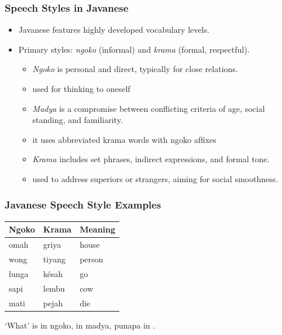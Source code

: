 \documentclass[xetex]{beamer}
\newcommand{\msa}{\mtciteform}
\begin{document}
\begin{frame}
\frametitle{Speech Styles in Javanese}
\begin{itemize}
    \item Javanese features highly developed vocabulary levels.
    \item Primary styles: \textit{ngoko} (informal) and \textit{krama} (formal, respectful).
      \begin{itemize}
      \item  \textit{Ngoko} is personal and direct, typically for close relations.
      \item[] used for thinking to oneself
         \item  \textit{Madya} is a compromise between conﬂicting criteria of
           age, social standing, and familiarity.
           \item[] it uses abbreviated krama words with ngoko afﬁxes
    \item \textit{Krama} includes set phrases, indirect expressions, and formal tone.
    \item[] used to address superiors or strangers, aiming for social smoothness.

      
      \end{itemize}
\end{itemize}
\end{frame}

\begin{frame}
\frametitle{Javanese Speech Style Examples}
\begin{table}[]
\centering
\begin{tabular}{lll}

\textbf{Ngoko} & \textbf{Krama} & \textbf{Meaning} \\
\hline
omah & griya & house \\
wong & tiyang & person \\
lunga & késah & go \\
sapi & lembu & cow \\
mati & pejah & die \\

\end{tabular}
\end{table}

‘What’ is \msa{apa} in ngoko, \msa{napa} in madya, punapa in \msa{krama}.

\end{frame}
\end{document}
